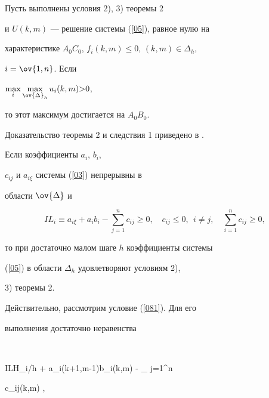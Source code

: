 \begin{cor}


Пусть выполнены условия 2), 3) теоремы 2


и $U(k,m)$ --- решение системы (\ref{05}), равное нулю на


характеристике $A_0C_0$, $f_i(k,m) \leq 0$, $(k,m) \in\Delta_h$,


$i=\ov{1,n}$. Если


$\max\limits_{i}\max\limits_{\ov{\Delta}_h} u_i(k,m){>}0$,


то этот максимум достигается на $A_0B_0$.


\end{cor}





Доказательство теоремы 2 и следствия 1 приведено в \cite{M2}.








\begin{note}


Если коэффициенты $a_{i}$, $b_{i}$,


$c_{ij}$ и $a_{i\xi}$ системы (\ref{03}) непрерывны в


области $\ov{\Delta}$ и


$$


IL_i \equiv a_{i\xi} + a_ib_i - \sum \limits_{j=1}^{n} c_{ij} \geq


0,\quad c_{ij}\leq 0,\ \ i\ne j, \quad


\sum\limits_{i=1}^{n}c_{ij}\geq 0,


$$


то при достаточно малом шаге $h$ коэффициенты системы


(\ref{05}) в области $\Delta_h$ удовлетворяют условиям 2),


3) теоремы 2.


\end{note}





Действительно, рассмотрим условие (\ref{081}). Для его


выполнения достаточно неравенства


$$


ILH_i\equiv [ a_i(k+1,m-1) -


a_i(k,m) ]/h + a_i(k+1,m-1)b_i(k,m) - \sum \limits _ {j=1}^n


c_{ij}(k,m) ,


